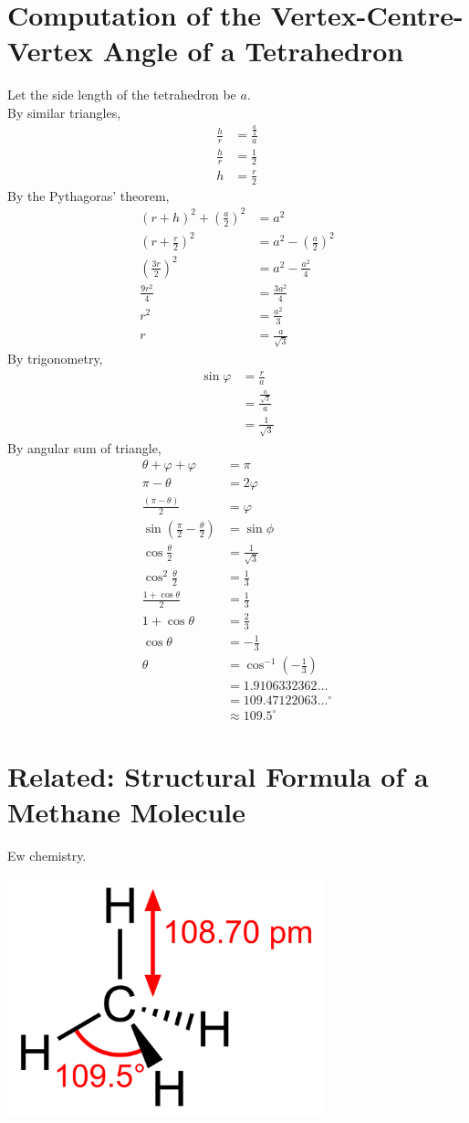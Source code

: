 \documentclass[a4paper]{article}
\begin{document}
\newpage
\section{Computation of the Vertex-Centre-Vertex Angle of a Tetrahedron}
Let the side length of the tetrahedron be \(a\).\\
By similar triangles,
\[\begin{aligned}
    \frac hr&=\frac{\frac a2}a\\
    \frac hr&=\frac12\\
    h&=\frac r2
\end{aligned}\]
By the Pythagoras' theorem,
\[\begin{aligned}
	{(r+h)}^2+\left(\frac a2\right)^2&=a^2\\
    \left(r+\frac r2\right)^2&=a^2-\left(\frac a2\right)^2\\
    \left(\frac{3r}2\right)^2&=a^2-\frac{a^2}4\\
    \frac{9r^2}4&=\frac{3a^2}4\\
    r^2&=\frac{a^2}3\\
    r&=\frac a{\sqrt3}
\end{aligned}\]
By trigonometry,
\[\begin{aligned}
    \sin\varphi&=\frac ra\\
            &=\frac{\frac a{\sqrt3}}a\\
            &=\frac1{\sqrt3}
\end{aligned}\]
By angular sum of triangle,
\[\begin{aligned}
    \theta+\varphi+\varphi&=\pi\\
    \pi-\theta&=2\varphi\\
    \frac{(\pi-\theta)}2&=\varphi\\
    \sin\left(\frac\pi2-\frac\theta2\right)&=\sin\phi\\
    \cos\frac\theta2&=\frac1{\sqrt3}\\
    \cos^2\frac\theta2&=\frac13\\
    \frac{1+\cos\theta}2&=\frac13\\
    1+\cos\theta&=\frac23\\
    \cos\theta&=-\frac13\\
    \theta&=\boxed{\cos^{-1}\left(-\frac13\right)}\\
          &=1.9106332362\dots\\
          &=109.47122063\dots^\circ\\
          &\approx109.5^\circ
\end{aligned}\]

\section{Related: Structural Formula of a Methane Molecule}
Ew chemistry.
\begin{center}
\includegraphics[width=0.69\textwidth]{methane.png}
\end{center}
\end{document}
